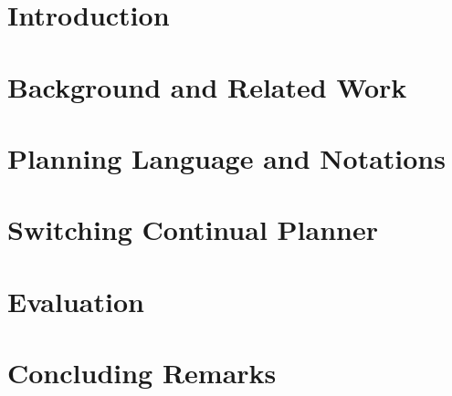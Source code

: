 \documentclass[letterpaper]{article}
\begin{document}
\section{Introduction}



\section{Background and Related Work}


\section{Planning Language and Notations}


\section{Switching Continual Planner}


\section{Evaluation}




\section{Concluding Remarks}





\end{document}
